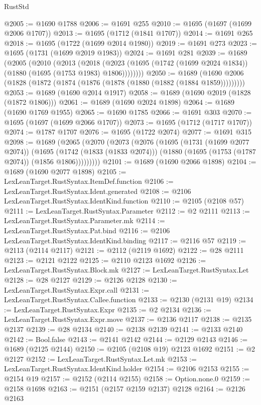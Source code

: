 \begin{lexlean}{RustStd}
\begin{coremodule}
{\begin{coremodule}
{{{{{{{{{{{{{{{{@2005 := @1690 @1788
@2006 := @1691 @255
@2010 := @1695 (@1697 (@1699 @2006 @1707))
@2013 := @1695 (@1712 (@1841 @1707))
@2014 := @1691 @265
@2018 := @1695 (@1722 (@1699 @2014 @1980))
@2019 := @1691 @273
@2023 := @1695 (@1731 (@1699 @2019 @1983))
@2024 := @1691 @281
@2039 := @1689
    (@2005
      (@2010
        (@2013
          (@2018 (@2023 (@1695 (@1742 (@1699 @2024 @1834)) (@1880 (@1695 (@1753 @1983) @1806))))))))
@2050 := @1689 (@1690 @2006 (@1828 (@1872 (@1874 (@1876 (@1878 (@1880 (@1882 (@1884 @1859)))))))))
@2053 := @1689 (@1690 @2014 @1917)
@2058 := @1689 (@1690 @2019 (@1828 (@1872 @1806)))
@2061 := @1689 (@1690 @2024 @1898)
@2064 := @1689 (@1690 @1769 @1955)
@2065 := @1690 @1785
@2066 := @1691 @303
@2070 := @1695 (@1697 (@1699 @2066 @1707))
@2073 := @1695 (@1712 (@1717 @1707))
@2074 := @1787 @1707
@2076 := @1695 (@1722 @2074)
@2077 := @1691 @315
@2098 := @1689
    (@2065
      (@2070
        (@2073
          (@2076
            (@1695
              (@1731 (@1699 @2077 @2074))
              (@1695
                (@1742 (@1833 (@1833 @2074)))
                (@1880 (@1695 (@1753 (@1787 @2074)) (@1856 @1806)))))))))
@2101 := @1689 (@1690 @2066 @1898)
@2104 := @1689 (@1690 @2077 @1898)
@2105 := LexLeanTarget.RustSyntax.ItemDef.function
@2106 := LexLeanTarget.RustSyntax.Ident.generated
@2108 := @2106 LexLeanTarget.RustSyntax.IdentKind.function
@2110 := @2105 (@2108 @57)
@2111 := LexLeanTarget.RustSyntax.Parameter
@2112 := @2 @2111
@2113 := LexLeanTarget.RustSyntax.Parameter.mk
@2114 := LexLeanTarget.RustSyntax.Pat.bind
@2116 := @2106 LexLeanTarget.RustSyntax.IdentKind.binding
@2117 := @2116 @57
@2119 := @2113 (@2114 @2117)
@2121 := @2112 (@2119 @1692)
@2122 := @28 @2111
@2123 := @2121 @2122
@2125 := @2110 @2123 @1692
@2126 := LexLeanTarget.RustSyntax.Block.mk
@2127 := LexLeanTarget.RustSyntax.Let
@2128 := @28 @2127
@2129 := @2126 @2128
@2130 := LexLeanTarget.RustSyntax.Expr.call
@2131 := LexLeanTarget.RustSyntax.Callee.function
@2133 := @2130 (@2131 @19)
@2134 := LexLeanTarget.RustSyntax.Expr
@2135 := @2 @2134
@2136 := LexLeanTarget.RustSyntax.Expr.move
@2137 := @2136 @2117
@2138 := @2135 @2137
@2139 := @28 @2134
@2140 := @2138 @2139
@2141 := @2133 @2140
@2142 := Bool.false
@2143 := @2141 @2142
@2144 := @2129 @2143
@2146 := @1689 (@2125 @2144)
@2150 := @2105 (@2108 @19) @2123 @1692
@2151 := @2 @2127
@2152 := LexLeanTarget.RustSyntax.Let.mk
@2153 := LexLeanTarget.RustSyntax.IdentKind.holder
@2154 := @2106 @2153
@2155 := @2154 @19
@2157 := @2152 (@2114 @2155)
@2158 := Option.none.{0}
@2159 := @2158 @1698
@2163 := @2151 (@2157 @2159 @2137) @2128
@2164 := @2126 @2163
}}}}}}}}}}}}}}}}
\end{coremodule}}
\end{coremodule}
\end{lexlean}
